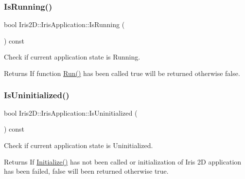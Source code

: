 \subsubsection{\texorpdfstring{Is\+Running()}{IsRunning()}}
{\footnotesize\ttfamily bool Iris2\+D\+::\+Iris\+Application\+::\+Is\+Running (\begin{DoxyParamCaption}{ }\end{DoxyParamCaption}) const}



Check if current application state is Running. 

\begin{DoxyReturn}{Returns}
If function \hyperlink{class_iris2_d_1_1_iris_application_ae6bb59365978c945201fd8cf82105e4f}{Run()} has been called true will be returned otherwise false. 
\end{DoxyReturn}
\mbox{\label{class_iris2_d_1_1_iris_application_a1035e03a186b934ecf57371e42475eea}} 
\subsubsection{\texorpdfstring{Is\+Uninitialized()}{IsUninitialized()}}
{\footnotesize\ttfamily bool Iris2\+D\+::\+Iris\+Application\+::\+Is\+Uninitialized (\begin{DoxyParamCaption}{ }\end{DoxyParamCaption}) const}



Check if current application state is Uninitialized. 

\begin{DoxyReturn}{Returns}
If \hyperlink{class_iris2_d_1_1_iris_application_a84f3ddebb3a3ffb0c172bd41fb952e1a}{Initialize()} has not been called or initialization of Iris 2D application has been failed, false will been returned otherwise true. 
\end{DoxyReturn}
\mbox{\label{class_iris2_d_1_1_iris_application_adca8cada1a8841c3f409e856f6878331}} 
